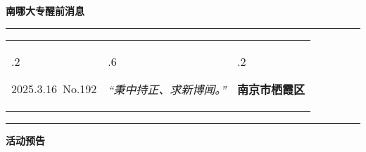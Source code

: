\documentclass[letterpaper, 12pt]{article}
\begin{document}
\begin{center}
    \Huge\textbf{南哪大专醒前消息}
\end{center}
\vspace{4mm}
\hrule
\renewcommand\tabularxcolumn[1]{m{#1}}
\begin{tabularx}{\textwidth}{>{\hsize.2\hsize}X>{\hsize.6\hsize}X>{\hsize.2\hsize}X}
    \begin{flushleft}
        2025.3.16\, No.192
    \end{flushleft}
    &
    \begin{center}
        \textit{“秉中持正、求新博闻。”}
    \end{center}
    &
    \begin{flushright}
        \textbf{南京市栖霞区}
    \end{flushright}
\end{tabularx}
\vspace{-3.5mm}
\hrule
\vspace{4mm}
\centerline{\huge\textbf{活动预告}}
\end{document}
